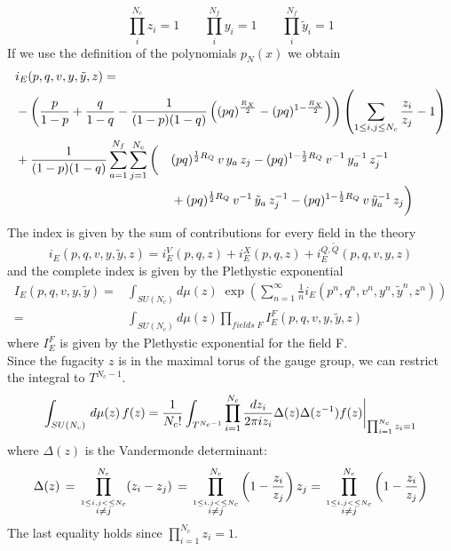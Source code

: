 \begin{equation}
\prod_i^{N_c} z_i = 1 \qquad \prod_i^{N_f} y_i = 1 \qquad \prod_i^{N_f} \tilde{y}_i = 1   
\end{equation}
If we use the definition of the polynomials $p_N(x)$ we obtain
\begin{equation}
\begin{aligned}
 & i_E (p,q,v, y,\tilde y ,z) = \\ 
 & 
  -\left({p \over 1-p}+{q \over 1-q} -{1 \over (1-p)(1-q)}
\left((p q)^{\frac{R_X}{2}}- (p q)^{1-\frac{R_X}{2}}\right)
\right) \left( \sum_{1\leq i,j \leq N_c} \frac{z_i}{z_j}-1\right ) \\ 
&
\begin{aligned}
&
+{1\over (1-p)(1-q)} \sum_{a=1}^{N_f} \sum_{j=1}^{N_c}
\bigg(
&&(p q)^{{1\over 2}R_Q} \, v \, y_a \, z_j
- (p q)^{1- {1\over 2} R_Q} \, v^{-1} \, y_a^{-1} \, z_j^{-1} \\
&
 && +
(p q)^{{1\over 2}R_Q}\, v^{-1}\, {\tilde y}_a \,z_j^{-1}
- (p q)^{1- {1\over 2}R_Q} \, v\, {\tilde y_a}^{-1}\, z_j\bigg) \\
\end{aligned}
\end{aligned}
\end{equation}
The index is given by the sum of contributions for every field in the theory
\begin{equation}
i_E(p,q,v,y,\tilde{y},z) = i_E^V(p,q,z) + i_E^{X} (p,q,z) + i_E^{Q,\tilde{Q}}(p,q,v,y,z)
\end{equation}
and the complete index is given by the Plethystic exponential
\begin{equation}
\begin{aligned}
I_E(p,q,v,y,\tilde{y}) = & \int_{SU(N_c)} d \mu(z) \; \exp \left( \sum_{n=1}^{\infty} \frac{1}{n} i_E(p^n,q^n,v^n,y^n,\tilde{y}^n,z^n) \right) \\
= & \int_{SU(N_c)} d \mu (z) \prod_{fields \; F } I_E^F(p,q,v,y,\tilde{y},z) 
\end{aligned}
\end{equation}
where $I_E^F$ is given by the Plethystic exponential for the field F.\\
Since the fugacity $z$ is in the maximal torus of the gauge group, we can restrict the integral to $T^{N_c -1}$.
\begin{equation}
  \int_{SU(N_c)}\, d \mu(z) \, f(z) = {1 \over N_c!} \int_{T^{N_c-1}} \prod_{i=1}^{N_c }
  { d z_i \over { 2 \pi i z_i} } \Delta (z) \Delta (z^{-1}) f(z) \bigg \rvert_{\prod_{i=1}^{N_c} z_i = 1}
 \end{equation}
 where $\Delta (z) $ is the Vandermonde determinant:
 $$
 \Delta (z ) \, = \, \prod_{ \overset{1 \leq i,j< \leq N_c} { i \neq j}}^{N_c} ( z_i - z_j) \, = \,  \prod_{ \overset{1 \leq i,j< \leq N_c} { i \neq j}}^{N_c}\bigg ( 1 - {z_i \over  z_j } \bigg) \, z_j = \,  \prod_{ \overset{1 \leq i,j< \leq N_c} { i \neq j}}^{N_c}\bigg ( 1 - {z_i \over  z_j } \bigg)
 $$
The last equality holds since $ \prod_{i=1}^{N_c} z_i = 1$.
 
